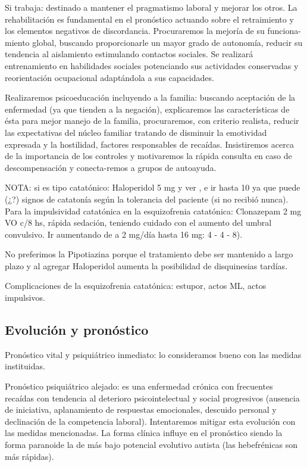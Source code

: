 \documentclass{scrbook}
\begin{document}
Si trabaja: destinado a mantener el pragmatismo laboral y mejorar los otros. La rehabilitación es fundamental en el pronóstico actuando sobre el retraimiento y los elementos negativos de discordancia. Procuraremos la mejoría de su funciona-miento global, buscando proporcionarle un mayor grado de autonomía, reducir su tendencia al aislamiento estimulando contactos sociales. Se realizará entrenamiento en habilidades sociales potenciando sus actividades conservadas y reorientación ocupacional adaptándola a sus capacidades.

Realizaremos psicoeducación incluyendo a la familia: buscando aceptación de la enfermedad (ya que tienden a la negación), explicaremos las características de ésta para mejor manejo de la familia, procuraremos, con criterio realista, reducir las expectativas del núcleo familiar tratando de disminuir la emotividad expresada y la hostilidad, factores responsables de recaídas. Insistiremos acerca de la importancia de los controles y motivaremos la rápida consulta en caso de descompensación y conecta-remos a grupos de autoayuda.

NOTA: si es tipo catatónico: Haloperidol 5 mg y ver , e ir hasta 10 ya que puede (¿?) signos de catatonía según la tolerancia del paciente (si no recibió nunca). Para la impulsividad catatónica en la esquizofrenia catatónica: Clonazepam 2 mg VO c/8 hs, rápida sedación, teniendo cuidado con el aumento del umbral convulsivo. Ir aumentando de a 2 mg/día hasta 16 mg: 4 - 4 - 8).

No preferimos la Pipotiazina porque el tratamiento debe ser mantenido a largo plazo y al agregar Haloperidol aumenta la posibilidad de disquinesias tardías.

Complicaciones de la esquizofrenia catatónica: estupor, actos ML, actos impulsivos.
\subsection*{Evolución y pronóstico}
Pronóstico vital y psiquiátrico inmediato: lo consideramos bueno con las medidas instituidas.

Pronóstico psiquiátrico alejado: es una enfermedad crónica con frecuentes recaídas con tendencia al deterioro psicointelectual y social progresivos (ausencia de iniciativa, aplanamiento de respuestas emocionales, descuido personal y declinación de la competencia laboral). Intentaremos mitigar esta evolución con las medidas mencionadas. La forma clínica influye en el pronóstico siendo la forma paranoide la de más bajo potencial evolutivo autista (las hebefrénicas son más rápidas).
\end{document}
